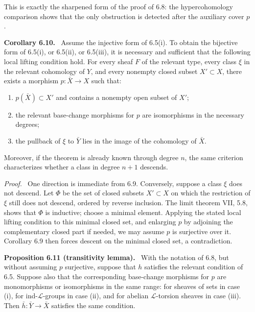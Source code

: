 \documentclass[12pt]{article}
\newcommand{\LL}{\mathcal L}
\newenvironment{statement}[1]{\par\medskip\noindent\textbf{#1.}\ }{\par\medskip}
\newenvironment{prooftext}[1][Proof]{\par\noindent\emph{#1.}\ }{\par\medskip}
\begin{document}
This is exactly the sharpened form of the proof of 6.8: the hypercohomology comparison shows that the only obstruction is detected after the auxiliary cover \(p\).

\begin{statement}{Corollary 6.10}
Assume the injective form of 6.5(i). To obtain the bijective form of 6.5(i), or 6.5(ii), or 6.5(iii), it is necessary and sufficient that the following local lifting condition hold. For every sheaf \(F\) of the relevant type, every class \(\xi\) in the relevant cohomology of \(Y\), and every nonempty closed subset \(X'\subset X\), there exists a morphism \(p:\bar X\to X\) such that:
\begin{enumerate}[label=\arabic*\textdegree)]
\item \(p(\bar X)\subset X'\) and contains a nonempty open subset of \(X'\);
\item the relevant base-change morphisms for \(p\) are isomorphisms in the necessary degrees;
\item the pullback of \(\xi\) to \(\bar Y\) lies in the image of the cohomology of \(\bar X\).
\end{enumerate}
Moreover, if the theorem is already known through degree \(n\), the same criterion characterizes whether a class in degree \(n+1\) descends.
\end{statement}

\begin{prooftext}
One direction is immediate from 6.9. Conversely, suppose a class \(\xi\) does not descend. Let \(\Phi\) be the set of closed subsets \(X'\subset X\) on which the restriction of \(\xi\) still does not descend, ordered by reverse inclusion. The limit theorem VII, 5.8, shows that \(\Phi\) is inductive; choose a minimal element. Applying the stated local lifting condition to this minimal closed set, and enlarging \(p\) by adjoining the complementary closed part if needed, we may assume \(p\) is surjective over it. Corollary 6.9 then forces descent on the minimal closed set, a contradiction.
\end{prooftext}

\begin{statement}{Proposition 6.11 (transitivity lemma)}
With the notation of 6.8, but without assuming \(p\) surjective, suppose that \(h\) satisfies the relevant condition of 6.5. Suppose also that the corresponding base-change morphisms for \(p\) are monomorphisms or isomorphisms in the same range: for sheaves of sets in case (i), for ind-\(\LL\)-groups in case (ii), and for abelian \(\LL\)-torsion sheaves in case (iii). Then \(\bar h:\bar Y\to\bar X\) satisfies the same condition.
\end{statement}
\end{document}

